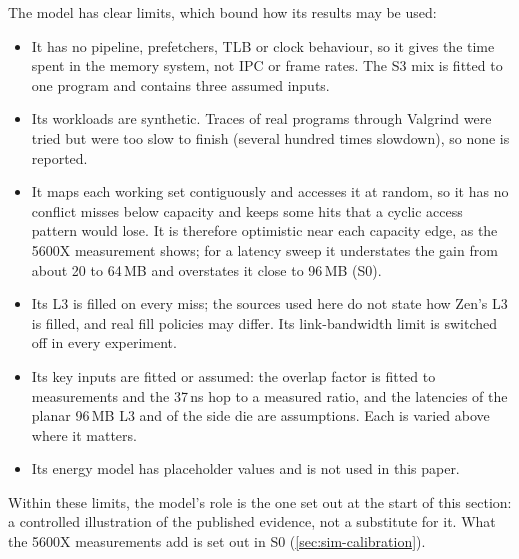 The model has clear limits, which bound how its results may be used:
\begin{itemize}
  \item It has no pipeline, prefetchers, TLB or clock behaviour, so it gives the time spent in the memory system, not IPC or frame rates. The S3 mix is fitted to one program and contains three assumed inputs.
  \item Its workloads are synthetic. Traces of real programs through Valgrind were tried but were too slow to finish (several hundred times slowdown), so none is reported.
  \item It maps each working set contiguously and accesses it at random, so it has no conflict misses below capacity and keeps some hits that a cyclic access pattern would lose. It is therefore optimistic near each capacity edge, as the 5600X measurement shows; for a latency sweep it understates the gain from about 20 to 64\,MB and overstates it close to 96\,MB (S0).
  \item Its L3 is filled on every miss; the sources used here do not state how Zen's L3 is filled, and real fill policies may differ. Its link-bandwidth limit is switched off in every experiment.
  \item Its key inputs are fitted or assumed: the overlap factor is fitted to measurements and the 37\,ns hop to a measured ratio, and the latencies of the planar 96\,MB L3 and of the side die are assumptions. Each is varied above where it matters.
  \item Its energy model has placeholder values and is not used in this paper.
\end{itemize}
Within these limits, the model's role is the one set out at the start of this section: a controlled illustration of the published evidence, not a substitute for it. What the 5600X measurements add is set out in S0 (\cref{sec:sim-calibration}).

